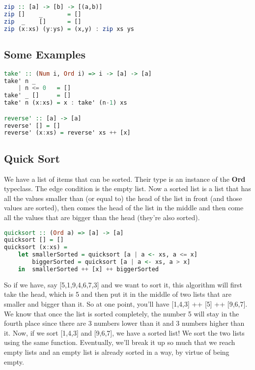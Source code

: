 \begin{lstlisting}[language=Haskell]
zip :: [a] -> [b] -> [(a,b)]
zip []    _       = []
zip  _    []      = []
zip (x:xs) (y:ys) = (x,y) : zip xs ys
\end{lstlisting}

\subsection{Some Examples}

\begin{lstlisting}[language=Haskell]
take' :: (Num i, Ord i) => i -> [a] -> [a]  
take' n _  
    | n <= 0   = []  
take' _ []     = []  
take' n (x:xs) = x : take' (n-1) xs 

reverse' :: [a] -> [a]  
reverse' [] = []  
reverse' (x:xs) = reverse' xs ++ [x]
\end{lstlisting}

\clearpage
\subsection{Quick Sort}

We have a list of items that can be sorted. Their type is an instance of the \textbf{Ord} typeclass. The edge condition is the empty list. Now a sorted list is a list that has all the values smaller than (or equal to) the head of the list in front (and those values are sorted), then comes the head of the list in the middle and then come all the values that are bigger than the head (they're also sorted).

\begin{lstlisting}[language=Haskell]
quicksort :: (Ord a) => [a] -> [a]  
quicksort [] = []  
quicksort (x:xs) =   
    let smallerSorted = quicksort [a | a <- xs, a <= x]  
        biggerSorted = quicksort [a | a <- xs, a > x]  
    in  smallerSorted ++ [x] ++ biggerSorted  
\end{lstlisting}

So if we have, say [5,1,9,4,6,7,3] and we want to sort it, this algorithm will first take the head, which is 5 and then put it in the middle of two lists that are smaller and bigger than it. So at one point, you'll have [1,4,3] ++ [5] ++ [9,6,7]. We know that once the list is sorted completely, the number 5 will stay in the fourth place since there are 3 numbers lower than it and 3 numbers higher than it. Now, if we sort [1,4,3] and [9,6,7], we have a sorted list! We sort the two lists using the same function. Eventually, we'll break it up so much that we reach empty lists and an empty list is already sorted in a way, by virtue of being empty.

\clearpage